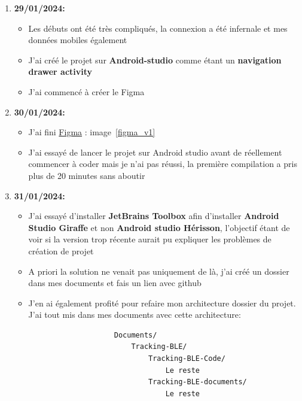 \documentclass[10pt,a4paper]{article}
\begin{document}
\begin{enumerate}
    \item \textbf{29/01/2024:}
        \begin{itemize}
            \item Les débuts ont été très compliqués, la connexion a été infernale et mes données mobiles également
            \item J'ai créé le projet sur \textbf{Android-studio} comme étant un \textbf{navigation drawer activity}
            \item J'ai commencé à créer le Figma
        \end{itemize}
    \item \textbf{30/01/2024:}
        \begin{itemize}
            \item J'ai fini \href{https://www.figma.com/proto/0Jh7ikCgIu2jUc2U5tIpNI/Tracking-BLE?type=design&node-id=1-2&t=LAlJHjfGajoQFf8A-0&scaling=scale-down&page-id=0%3A1&starting-point-node-id=1%3A2}{Figma} : image~\ref{figma_v1}
            \item J'ai essayé de lancer le projet sur Android studio avant de réellement commencer à coder mais je n'ai pas réussi, la première compilation a pris plus de 20 minutes sans aboutir
        \end{itemize}
    \item \textbf{31/01/2024:}
        \begin{itemize}
            \item J'ai essayé d'installer \textbf{JetBrains Toolbox} afin d'installer \textbf{Android Studio Giraffe} et non \textbf{Android studio Hérisson}, l'objectif étant de voir si la version trop récente aurait pu expliquer les problèmes de création de projet
            \item A priori la solution ne venait pas uniquement de là, j'ai créé un dossier dans mes documents et fais un lien avec github
            \item J'en ai également profité pour refaire mon architecture dossier du projet. J'ai tout mis dans mes documents avec cette architecture:
            \begin{center}
                \begin{verbatim}
                    Documents/
                        Tracking-BLE/
                            Tracking-BLE-Code/
                                Le reste
                            Tracking-BLE-documents/
                                Le reste
                \end{verbatim}
            \end{center}

\end{itemize}
\end{enumerate}
\end{document}
